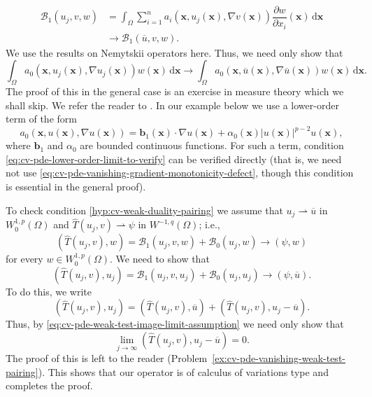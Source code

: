 \begin{Proof}
\[\begin{aligned}
\mathcal{B}_1(u_j,v,w)&=\int_\Omega\sum_{i=1}^na_i(\bm{x},u_j(\bm{x}),\nabla v(\bm{x}))\dfrac{\partial w}{\partial x_i}(\bm{x})\,\mathrm{d}\bm{x}\\
&\to\mathcal{B}_1(\overline u,v,w).
\end{aligned}\]We use the results on Nemytskii operators here. Thus, we need only show that
\begin{equation}\label{eq:cv-pde-lower-order-limit-to-verify}
\int_\Omega a_0(\bm{x},u_j(\bm{x}),\nabla u_j(\bm{x}))w(\bm{x})\,\mathrm{d}\bm{x}\to\int_\Omega a_0(\bm{x},\overline u(\bm{x}),\nabla\overline u(\bm{x}))w(\bm{x})\,\mathrm{d}\bm{x}.
\end{equation}
The proof of this in the general case is an exercise in measure theory which we shall skip. We refer the reader to \cite[Lemma 2.2, p.~184]{Li}. In our example below we use a lower-order term of the form
\begin{equation}\label{eq:cv-pde-linear-drift-p-power-lower-order-term}
a_0(\bm{x},u(\bm{x}),\nabla u(\bm{x}))=\bm{b}_1(\bm{x})\cdot\nabla u(\bm{x})+\alpha_0(\bm{x})|u(\bm{x})|^{p-2}u(\bm{x}),
\end{equation}
where $\bm{b}_1$ and $\alpha_0$ are bounded continuous functions. For such a term, condition \eqref{eq:cv-pde-lower-order-limit-to-verify} can be verified directly (that is, we need not use \eqref{eq:cv-pde-vanishing-gradient-monotonicity-defect}, though this condition is essential in the general proof).

To check condition \ref{hyp:cv-weak-duality-pairing} we assume that $u_j\rightharpoonup\overline u$ in $W_0^{1,p}(\Omega)$ and $\widehat T(u_j,v)\rightharpoonup\psi$ in $W^{-1,q}(\Omega)$; i.e.,
\begin{equation}\label{eq:cv-pde-weak-test-image-limit-assumption}
(\widehat T(u_j,v),w)=\mathcal{B}_1(u_j,v,w)+\mathcal{B}_0(u_j,w)\to(\psi,w)
\end{equation}
for every $w\in W_0^{1,p}(\Omega)$. We need to show that
\begin{equation}\label{eq:cv-pde-weak-duality-pairing-limit-goal}
(\widehat T(u_j,v),u_j)=\mathcal{B}_1(u_j,v,u_j)+\mathcal{B}_0(u_j,u_j)\to(\psi,\overline u).
\end{equation}
To do this, we write
\begin{equation}\label{eq:cv-pde-weak-duality-pairing-splitting}
(\widehat T(u_j,v),u_j)=(\widehat T(u_j,v),\overline u)+(\widehat T(u_j,v),u_j-\overline u).
\end{equation}
Thus, by \eqref{eq:cv-pde-weak-test-image-limit-assumption} we need only show that
\begin{equation}\label{eq:cv-pde-vanishing-weak-test-pairing-exercise}
\lim_{j\to\infty}(\widehat T(u_j,v),u_j-\overline u)=0.
\end{equation}
The proof of this is left to the reader (Problem~\ref{ex:cv-pde-vanishing-weak-test-pairing}). This shows that our operator is of calculus of variations type and completes the proof.
\end{Proof}
\endgroup
\endgroup

